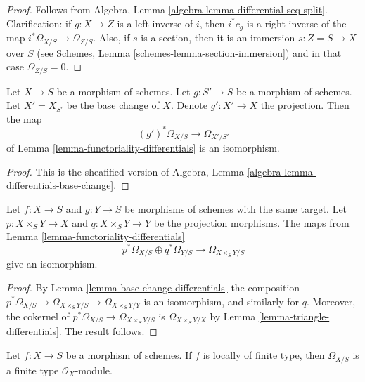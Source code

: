 \begin{proof}
Follows from
Algebra, Lemma \ref{algebra-lemma-differential-seq-split}.
Clarification: if $g : X \to Z$ is a left inverse of $i$, then
$i^*c_g$ is a right inverse of the map $i^*\Omega_{X/S} \to \Omega_{Z/S}$.
Also, if $s$ is a section, then it is an immersion $s : Z = S \to X$
over $S$ (see
Schemes, Lemma \ref{schemes-lemma-section-immersion})
and in that case $\Omega_{Z/S} = 0$.
\end{proof}

\begin{lemma}
\label{lemma-base-change-differentials}
Let $X \to S$ be a morphism of schemes.
Let $g : S' \to S$ be a morphism of schemes.
Let $X' = X_{S'}$ be the base change of $X$.
Denote $g' : X' \to X$ the projection.
Then the map
$$
(g')^*\Omega_{X/S} \to \Omega_{X'/S'}
$$
of Lemma \ref{lemma-functoriality-differentials} is an isomorphism.
\end{lemma}

\begin{proof}
This is the sheafified version of
Algebra, Lemma \ref{algebra-lemma-differentials-base-change}.
\end{proof}

\begin{lemma}
\label{lemma-differential-product}
Let $f : X \to S$ and $g : Y \to S$ be morphisms of schemes with the same
target. Let $p : X \times_S Y \to X$ and $q : X \times_S Y \to Y$ be the
projection morphisms. The maps from
Lemma \ref{lemma-functoriality-differentials}
$$
p^*\Omega_{X/S} \oplus q^*\Omega_{Y/S}
\longrightarrow
\Omega_{X \times_S Y/S}
$$
give an isomorphism.
\end{lemma}

\begin{proof}
By Lemma \ref{lemma-base-change-differentials} the composition
$p^*\Omega_{X/S} \to \Omega_{X \times_S Y/S} \to \Omega_{X \times_S Y/Y}$
is an isomorphism, and similarly for $q$. Moreover, the cokernel
of $p^*\Omega_{X/S} \to \Omega_{X \times_S Y/S}$ is
$\Omega_{X \times_S Y/X}$ by
Lemma \ref{lemma-triangle-differentials}. The result follows.
\end{proof}





\begin{lemma}
\label{lemma-finite-type-differentials}
Let $f : X \to S$ be a morphism of schemes.
If $f$ is locally of finite type, then $\Omega_{X/S}$ is
a finite type $\mathcal{O}_X$-module.
\end{lemma}

